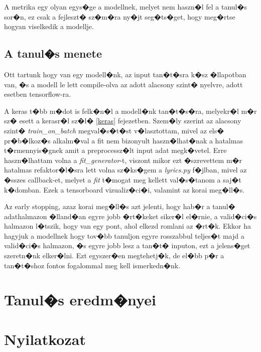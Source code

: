 \documentclass[12pt]{report}
\theoremstyle{definition}
\begin{document}
A metrika egy olyan egys�ge a modellnek, melyet nem haszn�l fel a tanul�s sor�n, ez csak a fejleszt� sz�m�ra ny�jt seg�ts�get, hogy meg�rtse hogyan viselkedik a modellje.

\section{A tanul�s menete}

Ott tartunk hogy van egy modell�nk, az input tan�t�sra k�sz �llapotban van, �s a modell le lett compile-olva az adott alacsony szint� nyelvre, adott esetben tensorflow-ra.

A keras t�bb m�dot is felk�n�l a modell�nk tan�t�s�ra, melyekr�l m�r sz� esett a kerasr�l sz�l� \ref{keras} fejezetben. Szem�ly szerint az alacsony szint� \textit{train\_on\_batch} megval�s�t�st v�lasztottam, mivel az els� pr�b�lkoz�s alkalm�val a fit nem bizonyult haszn�lhat�nak a hatalmas t�rmennyis�gnek amit a preprocessz�lt input adat megk�vetel. Erre haszn�lhattam volna a \textit{fit\_generator}-t, viszont mikor ezt �szrevettem m�r hatalmas refaktor�l�sra lett volna sz�ks�gem a \textit{lyrics.py} f�jlban, mivel az �sszes callback-et, melyet a \textit{fit} t�mogat meg kellett val�s�tanom a saj�t k�domban. Ezek a tensorboard vizualiz�ci�i, valamint az korai meg�ll�s.

Az early stopping, azaz korai meg�ll�s azt jelenti, hogy hab�r a tanul� adathalmazon �lland�an egyre jobb �rt�keket siker�l el�rnie, a valid�ci�s halmazon l�tszik, hogy van egy pont, ahol elkezd romlani az �rt�k. Ekkor ha hagyjuk a modellnek hogy tov�bb tanuljon egyre rosszabbul teljes�t majd a valid�ci�s halmazon, �s egyre jobb lesz a tan�t� inputon, ezt a jelens�get szeretn�nk elker�lni. Ezt egyszer�en megtehetj�k, de el�bb p�r a tan�t�shoz fontos fogalommal meg kell ismerkedn�nk.




\chapter{Tanul�s eredm�nyei}

\chapter*{Nyilatkozat}
\end{document}

